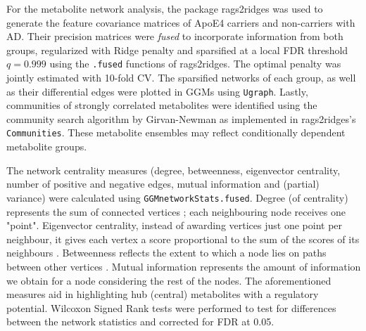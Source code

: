 \documentclass{amsart}
\begin{document}
For the metabolite network analysis, the package \textsf{rags2ridges} \cite{Peeters2022Rags2ridges:Matrices} was used to generate the feature covariance matrices of ApoE4 carriers and non-carriers with AD. Their precision matrices were \textit{fused} to incorporate information from both groups, regularized with Ridge penalty and sparsified at a local FDR threshold $q=0.999$ using the \texttt{.fused} functions of \textsf{rags2ridges}. The optimal penalty was jointly estimated with 10-fold CV. The sparsified networks of each group, as well as their differential edges were plotted in GGMs using \texttt{Ugraph}.  Lastly, communities of strongly correlated metabolites were identified using the community search algorithm by Girvan-Newman \cite{PhysRevE.69.026113} as implemented in \textsf{rags2ridges}'s \texttt{Communities}. These metabolite ensembles may reflect conditionally dependent metabolite groups.

The network centrality measures (degree, betweenness, eigenvector centrality, number of positive and negative edges, mutual information and (partial) variance) were calculated using \texttt{GGMnetworkStats.fused}. Degree (of centrality) represents  the sum of connected vertices \cite{newman2010Networks}; each neighbouring node receives one "point".  Eigenvector centrality, instead of awarding vertices just one point per neighbour, it gives each vertex a score proportional to the sum of the scores of its neighbours \cite{newman2010Networks}. Betweenness reflects the extent to which a node lies on paths between other vertices \cite{newman2010Networks}. Mutual information represents the amount of information we obtain for a node considering the rest of the nodes. The aforementioned measures aid in highlighting hub (central) metabolites with a regulatory potential. Wilcoxon Signed Rank tests were performed to test for differences between the network statistics and corrected for FDR at 0.05.    \clearpage
\end{document}
